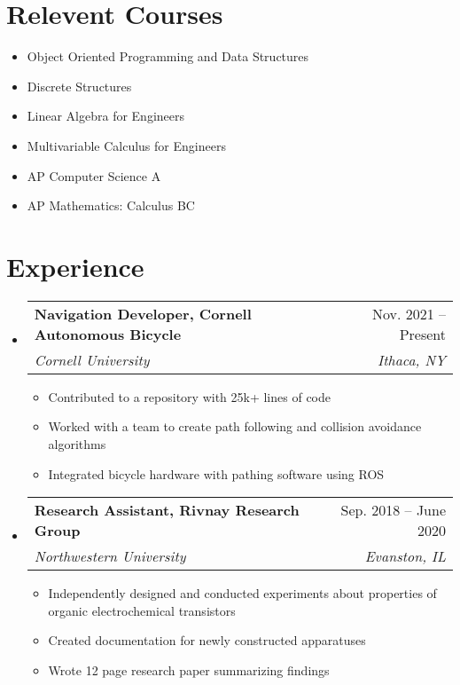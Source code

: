 \documentclass[letterpaper,11pt]{article}
\makeatletter
\newcommand{\resumeItem}[1]{
  \item\small{
    {#1 \vspace{-2pt}}
  }
}
\newcommand{\resumeSubheading}[4]{
  \vspace{-2pt}\item
    \begin{tabular*}{0.97\textwidth}[t]{l@{\extracolsep{\fill}}r}
      \textbf{#1} & #2 \\
      \textit{\small#3} & \textit{\small #4} \\
    \end{tabular*}\vspace{-7pt}
}
\newcommand{\resumeSubHeadingListStart}{\begin{itemize}[leftmargin=0.15in, label={}]}
\newcommand{\resumeSubHeadingListEnd}{\end{itemize}}
\newcommand{\resumeItemListStart}{\begin{itemize}}
\newcommand{\resumeItemListEnd}{\end{itemize}\vspace{-5pt}}
\makeatother
\begin{document}
\section{Relevent Courses}
  \begin{multicols}{2}\small
    \begin{itemize}
      \item Object Oriented Programming and Data Structures
      \item Discrete Structures
      \item Linear Algebra for Engineers
      \item Multivariable Calculus for Engineers
      \item AP Computer Science A
      \item AP Mathematics: Calculus BC
    \end{itemize}\normalsize
  \end{multicols}
  


\section{Experience}
  \resumeSubHeadingListStart

    \resumeSubheading
      {Navigation Developer, Cornell Autonomous Bicycle}{Nov. 2021 -- Present}
      {Cornell University}{Ithaca, NY}
      \resumeItemListStart
        \resumeItem{Contributed to a repository with 25k+ lines of code}
        \resumeItem{Worked with a team to create path following and collision avoidance algorithms}
        \resumeItem{Integrated bicycle hardware with pathing software using ROS}
      \resumeItemListEnd

    \resumeSubheading
      {Research Assistant, Rivnay Research Group}{Sep. 2018 -- June 2020}
      {Northwestern University}{Evanston, IL}
      \resumeItemListStart
        \resumeItem{Independently designed and conducted experiments about properties of organic electrochemical transistors}
        \resumeItem{Created documentation for newly constructed apparatuses}
        \resumeItem{Wrote 12 page research paper summarizing findings}
    \resumeItemListEnd

  \resumeSubHeadingListEnd


\end{document}
